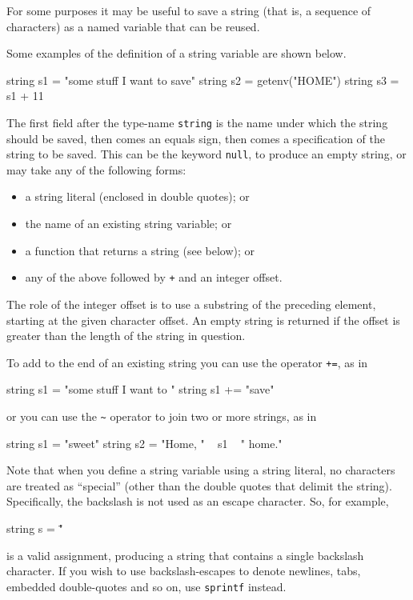 For some purposes it may be useful to save a string (that is, a
sequence of characters) as a named variable that can be reused.

Some examples of the definition of a string variable are shown
below.
%
\begin{code}
string s1 = "some stuff I want to save"
string s2 = getenv("HOME")
string s3 = s1 + 11
\end{code}
%
The first field after the type-name \texttt{string} is the name under
which the string should be saved, then comes an equals sign, then
comes a specification of the string to be saved. This can be the
keyword \texttt{null}, to produce an empty string, or may take any of
the following forms:

\begin{itemize}
\item a string literal (enclosed in double quotes); or
\item the name of an existing string variable; or
\item a function that returns a string (see below); or
\item any of the above followed by \texttt{+} and an integer offset.
\end{itemize}

The role of the integer offset is to use a substring of the preceding
element, starting at the given character offset.  An empty string is
returned if the offset is greater than the length of the string in
question.

To add to the end of an existing string you can use the operator
\texttt{+=}, as in
%
\begin{code}
string s1 = "some stuff I want to "
string s1 += "save"
\end{code}
or you can use the \verb|~| operator to join two or more strings, as
in
\begin{code}
string s1 = "sweet"
string s2 = "Home, " ~ s1 ~ " home."
\end{code}

Note that when you define a string variable using a string literal, no
characters are treated as ``special'' (other than the double quotes
that delimit the string).  Specifically, the backslash is not used as
an escape character.  So, for example,
%
\begin{code}
string s = "\"
\end{code}
%
is a valid assignment, producing a string that contains a single
backslash character.  If you wish to use backslash-escapes to denote
newlines, tabs, embedded double-quotes and so on, use \texttt{sprintf}
instead.

